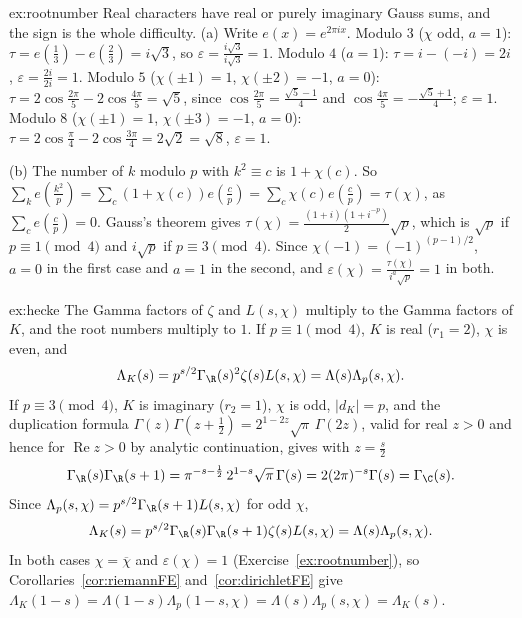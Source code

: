 \begin{solution}{ex:rootnumber}
\idea Real characters have real or purely imaginary Gauss sums, and the sign is the whole difficulty.
\writeup (a) Write $e(x)=e^{2\pi ix}$. Modulo $3$ ($\chi$ odd, $a=1$): $\tau=e(\frac13)-e(\frac23)=i\sqrt3$, so $\varepsilon=\frac{i\sqrt3}{i\sqrt3}=1$. Modulo $4$
($a=1$): $\tau=i-(-i)=2i$, $\varepsilon=\frac{2i}{2i}=1$. Modulo $5$ ($\chi(\pm1)=1$, $\chi(\pm2)=-1$, $a=0$): $\tau=2\cos\frac{2\pi}5-2\cos\frac{4\pi}5=\sqrt5$, since
$\cos\frac{2\pi}5=\frac{\sqrt5-1}4$ and $\cos\frac{4\pi}5=-\frac{\sqrt5+1}4$; $\varepsilon=1$. Modulo $8$ ($\chi(\pm1)=1$, $\chi(\pm3)=-1$, $a=0$):
$\tau=2\cos\frac\pi4-2\cos\frac{3\pi}4=2\sqrt2=\sqrt8$, $\varepsilon=1$.

(b) The number of $k$ modulo $p$ with $k^2\equiv c$ is $1+\chi(c)$. So $\sum_ke(\frac{k^2}p)=\sum_c(1+\chi(c))e(\frac cp)=\sum_c\chi(c)e(\frac cp)=\tau(\chi)$, as
$\sum_ce(\frac cp)=0$. Gauss's theorem gives $\tau(\chi)=\frac{(1+i)(1+i^{-p})}2\sqrt p$, which is $\sqrt p$ if $p\equiv1\pmod4$ and $i\sqrt p$ if $p\equiv3\pmod4$. Since
$\chi(-1)=(-1)^{(p-1)/2}$, $a=0$ in the first case and $a=1$ in the second, and $\varepsilon(\chi)=\frac{\tau(\chi)}{i^a\sqrt p}=1$ in both.
\end{solution}

\begin{solution}{ex:hecke}
\idea The Gamma factors of $\zeta$ and $L(s,\chi)$ multiply to the Gamma factors of $K$, and the root numbers multiply to $1$.
\writeup If $p\equiv1\pmod4$, $K$ is real ($r_1=2$), $\chi$ is even, and
\[
\Lambda_K(s)=p^{s/2}\Gamma_\R(s)^2\zeta(s)L(s,\chi)=\Lambda(s)\Lambda_p(s,\chi).
\] If $p\equiv3\pmod4$, $K$ is imaginary
($r_2=1$), $\chi$ is odd, $|d_K|=p$, and the duplication formula $\Gamma(z)\Gamma(z+\frac12)=2^{1-2z}\sqrt\pi\,\Gamma(2z)$, valid for real $z>0$ and hence for
$\operatorname{Re}z>0$ by analytic continuation, gives with $z=\frac s2$
\[
\Gamma_\R(s)\Gamma_\R(s+1)=\pi^{-s-\frac12}\,2^{1-s}\sqrt\pi\,\Gamma(s)=2(2\pi)^{-s}\Gamma(s)=\Gamma_\C(s).
\]
Since $\Lambda_p(s,\chi)=p^{s/2}\Gamma_\R(s+1)L(s,\chi)$ for odd $\chi$,
\[
\Lambda_K(s)=p^{s/2}\Gamma_\R(s)\Gamma_\R(s+1)\zeta(s)L(s,\chi)=\Lambda(s)\Lambda_p(s,\chi).
\]
In both cases $\chi=\overline\chi$ and $\varepsilon(\chi)=1$ (Exercise~\ref{ex:rootnumber}), so Corollaries~\ref{cor:riemannFE} and~\ref{cor:dirichletFE} give
$\Lambda_K(1-s)=\Lambda(1-s)\Lambda_p(1-s,\chi)=\Lambda(s)\Lambda_p(s,\chi)=\Lambda_K(s)$.
\end{solution}

